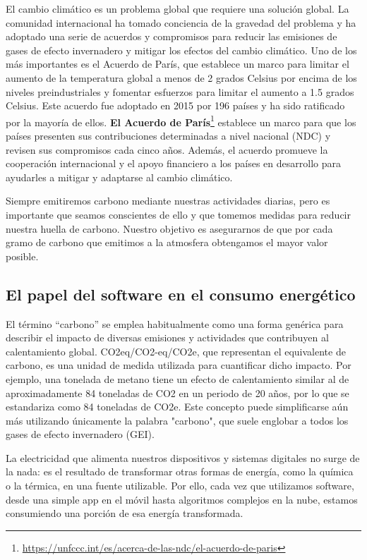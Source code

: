 \documentclass[12pt,a4paper]{report}
\begin{document}
El cambio climático es un problema global que requiere una solución global. La
comunidad internacional ha tomado conciencia de la gravedad del problema y ha
adoptado una serie de acuerdos y compromisos para reducir las emisiones de
gases de efecto invernadero y mitigar los efectos del cambio climático. Uno de
los más importantes es el Acuerdo de París, que establece un marco para limitar
el aumento de la temperatura global a menos de 2 grados Celsius por encima de
los niveles preindustriales y fomentar esfuerzos para limitar el aumento a 1.5
grados Celsius. Este acuerdo fue adoptado en 2015 por 196 países y ha sido
ratificado por la mayoría de ellos. \textbf{El Acuerdo de París}\footnote{\href{https://unfccc.int/es/acerca-de-las-ndc/el-acuerdo-de-paris}{https://unfccc.int/es/acerca-de-las-ndc/el-acuerdo-de-paris}} establece un marco para
que los países presenten sus contribuciones determinadas a nivel nacional (NDC)
y revisen sus compromisos cada cinco años. Además, el acuerdo promueve la
cooperación internacional y el apoyo financiero a los países en desarrollo para
ayudarles a mitigar y adaptarse al cambio climático.

Siempre emitiremos carbono mediante nuestras actividades diarias, pero es
importante que seamos conscientes de ello y que tomemos medidas para reducir
nuestra huella de carbono. Nuestro objetivo es asegurarnos de que por cada
gramo de carbono que emitimos a la atmosfera obtengamos el mayor valor posible.

\subsection{El papel del software en el consumo energético}

El término ``carbono'' se emplea habitualmente como una forma genérica para
describir el impacto de diversas emisiones y actividades que contribuyen al
calentamiento global. CO2eq/CO2-eq/CO2e, que representan el equivalente de
carbono, es una unidad de medida utilizada para cuantificar dicho impacto. Por
ejemplo, una tonelada de metano tiene un efecto de calentamiento similar al de
aproximadamente 84 toneladas de CO2 en un periodo de 20 años, por lo que se
estandariza como 84 toneladas de CO2e. Este concepto puede simplificarse aún
más utilizando únicamente la palabra "carbono", que suele englobar a todos los
gases de efecto invernadero (GEI).

La electricidad que alimenta nuestros dispositivos y sistemas digitales no
surge de la nada: es el resultado de transformar otras formas de energía, como
la química o la térmica, en una fuente utilizable. Por ello, cada vez que
utilizamos software, desde una simple app en el móvil hasta algoritmos
complejos en la nube, estamos consumiendo una porción de esa energía
transformada.
\end{document}
